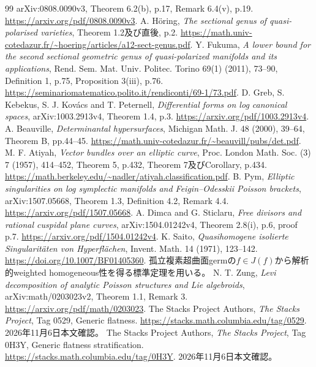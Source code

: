 \documentclass[a4paper,11pt]{ltjsarticle}
\theoremstyle{definition}
\begin{document}
\begin{thebibliography}{99}
arXiv:0808.0090v3, Theorem 6.2(b), p.17, Remark 6.4(v), p.19.
\url{https://arxiv.org/pdf/0808.0090v3}.
 A. H\"oring,
\emph{The sectional genus of quasi-polarised varieties},
Theorem 1.2及び直後, p.2.
\url{https://math.univ-cotedazur.fr/~hoering/articles/a12-sect-genus.pdf}.
 Y. Fukuma,
\emph{A lower bound for the second sectional geometric genus of quasi-polarized manifolds and its applications},
Rend. Sem. Mat. Univ. Politec. Torino 69(1) (2011), 73--90,
Definition 1, p.75, Proposition 3(iii), p.76.
\url{https://seminariomatematico.polito.it/rendiconti/69-1/73.pdf}.
 D. Greb, S. Kebekus, S. J. Kov\'acs and T. Peternell,
\emph{Differential forms on log canonical spaces},
arXiv:1003.2913v4, Theorem 1.4, p.3.
\url{https://arxiv.org/pdf/1003.2913v4}.
 A. Beauville,
\emph{Determinantal hypersurfaces},
Michigan Math. J. 48 (2000), 39--64, Theorem B, pp.44--45.
\url{https://math.univ-cotedazur.fr/~beauvill/pubs/det.pdf}.
 M. F. Atiyah,
\emph{Vector bundles over an elliptic curve},
Proc. London Math. Soc. (3) 7 (1957), 414--452,
Theorem 5, p.432, Theorem 7及びCorollary, p.434.
\url{https://math.berkeley.edu/~nadler/atiyah.classification.pdf}.
 B. Pym,
\emph{Elliptic singularities on log symplectic manifolds and Feigin--Odesskii Poisson brackets},
arXiv:1507.05668, Theorem 1.3, Definition 4.2, Remark 4.4.
\url{https://arxiv.org/pdf/1507.05668}.
 A. Dimca and G. Sticlaru,
\emph{Free divisors and rational cuspidal plane curves},
arXiv:1504.01242v4, Theorem 2.8(i), p.6, proof p.7.
\url{https://arxiv.org/pdf/1504.01242v4}.
 K. Saito,
\emph{Quasihomogene isolierte Singularit\"aten von Hyperfl\"achen},
Invent. Math. 14 (1971), 123--142.
\url{https://doi.org/10.1007/BF01405360}.
孤立複素超曲面germの$f\in J(f)$から解析的weighted homogeneous性を得る標準定理を用いる。
 N. T. Zung,
\emph{Levi decomposition of analytic Poisson structures and Lie algebroids},
arXiv:math/0203023v2, Theorem 1.1, Remark 3.
\url{https://arxiv.org/pdf/math/0203023}.
 The Stacks Project Authors,
\emph{The Stacks Project}, Tag 0529, Generic flatness.
\url{https://stacks.math.columbia.edu/tag/0529}.
2026年11月6日本文確認。
 The Stacks Project Authors,
\emph{The Stacks Project}, Tag 0H3Y, Generic flatness stratification.
\url{https://stacks.math.columbia.edu/tag/0H3Y}.
2026年11月6日本文確認。
\end{thebibliography}
\end{document}
